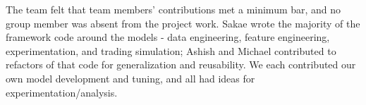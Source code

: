 \documentclass[10pt,twocolumn,letterpaper]{article}
\begin{document}
The team felt that team members’ contributions met a minimum bar, and no group member was absent from the project work. Sakae wrote the majority of the framework code around the models - data engineering, feature engineering, experimentation, and trading simulation; Ashish and Michael contributed to refactors of that code for generalization and reusability. We each contributed our own model development and tuning, and all had ideas for experimentation/analysis.




\end{document}
